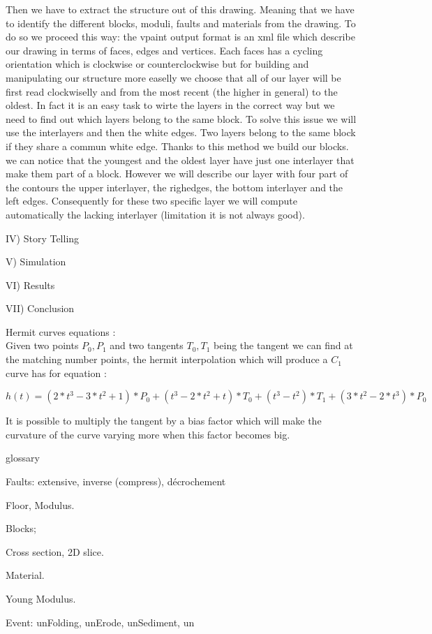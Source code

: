 \documentclass[12pt, a4paper]{memoir} %
\begin{document}
Then we have to extract the structure out of this drawing. Meaning that we have to identify the different blocks, moduli, faults and materials from the drawing. To do so we proceed this way: the vpaint output format is an xml file which describe our drawing in terms
of faces, edges and vertices. Each faces has a cycling orientation which is clockwise or counterclockwise but for building and manipulating our structure more easelly we choose that all of our layer will be first read clockwiselly and from the most recent (the higher in general) to the oldest. In fact it is an easy task to wirte the layers in the correct way but we need to find out which layers belong to the same block. To solve this issue we will use the interlayers and then the white edges. Two layers belong to the same block if they share a commun white edge. Thanks to this method we build our blocks. we can notice that the youngest and the oldest layer have just one interlayer that make them part of a block. However we will describe our layer with four part of the contours the upper interlayer, the righedges, the bottom interlayer and the left edges. Consequently for these two specific layer we will compute automatically the lacking interlayer (limitation it is not always good).
	

IV) Story Telling


V) Simulation



VI) Results

VII) Conclusion

Hermit curves equations :\\
Given two points $P_0, P_1$ and two tangents $T_0, T_1$ being the tangent we can find at the matching number points, the hermit interpolation which will produce a $C_1$ curve has for equation : 


\begin{equation}
h(t) = (2*t^3 - 3*t^2 + 1)*P_0 + (t^3 - 2*t^2 + t)*T_0 + (t^3 -t^2)*T_1 +(3*t^2 - 2*t^3)*P_0
\end{equation}

It is possible to multiply the tangent by a bias factor which will make the curvature of the curve varying more when this factor becomes big.

glossary
	
Faults: extensive, inverse (compress), décrochement

Floor, Modulus.

Blocks;

Cross section, 2D slice.

Material.

Young Modulus.

Event: unFolding, unErode, unSediment, un



\end{document}
